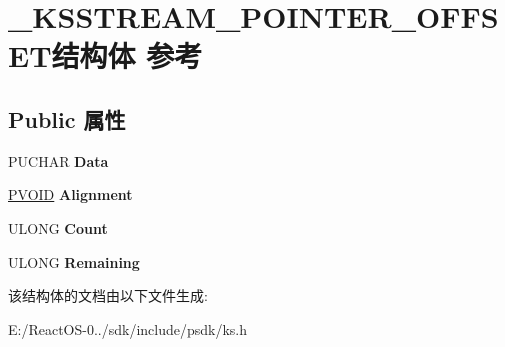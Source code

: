 \hypertarget{struct___k_s_s_t_r_e_a_m___p_o_i_n_t_e_r___o_f_f_s_e_t}{}\section{\+\_\+\+K\+S\+S\+T\+R\+E\+A\+M\+\_\+\+P\+O\+I\+N\+T\+E\+R\+\_\+\+O\+F\+F\+S\+E\+T结构体 参考}
\label{struct___k_s_s_t_r_e_a_m___p_o_i_n_t_e_r___o_f_f_s_e_t}
\subsection*{Public 属性}
\begin{DoxyCompactItemize}
\item 
\mbox{\label{struct___k_s_s_t_r_e_a_m___p_o_i_n_t_e_r___o_f_f_s_e_t_a58160f3fc0f978390de87046b9e58712}} 
P\+U\+C\+H\+AR {\bfseries Data}
\item 
\mbox{\label{struct___k_s_s_t_r_e_a_m___p_o_i_n_t_e_r___o_f_f_s_e_t_a9a7b88d5858708330fdf28da9e153c4c}} 
\hyperlink{interfacevoid}{P\+V\+O\+ID} {\bfseries Alignment}
\item 
\mbox{\label{struct___k_s_s_t_r_e_a_m___p_o_i_n_t_e_r___o_f_f_s_e_t_a8d0c0eda18ca70d88f01b5effacecfd1}} 
U\+L\+O\+NG {\bfseries Count}
\item 
\mbox{\label{struct___k_s_s_t_r_e_a_m___p_o_i_n_t_e_r___o_f_f_s_e_t_a241b6dc7b610360c9a3aa26675fa30e8}} 
U\+L\+O\+NG {\bfseries Remaining}
\end{DoxyCompactItemize}


该结构体的文档由以下文件生成\+:\begin{DoxyCompactItemize}
\item 
E\+:/\+React\+O\+S-\/0../sdk/include/psdk/ks.\+h\end{DoxyCompactItemize}
